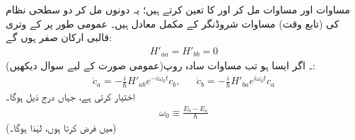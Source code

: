 مساوات  اور مساوات   مل کر  اور   کا  تعین کرتے ہیں؛   یہ دونوں مل کر دو  سطحی  نظام کی  (تابع وقت)  مساوات شروڈنگر کے مکمل معادل ہیں۔ عمومی طور پر  کے وتری قالبی  ارکان  صفر ہوں گے:
\begin{align}
	H'_{aa}=H'_{bb}=0
\end{align}
 (عمومی صورت کے لیے سوال   دیکھیں)۔ اگر ایسا ہو تب مساوات سادہ روپ:
\begin{align}\label{مساوات_تابع_مضطرب_شرح_ضربیات}
	\dot{c}_a=-\frac{i}{\hslash}H'_{ab}e^{-i\omega_0t}c_b,&&\dot{c}_b=-\frac{i}{\hslash}H'_{ba}e^{i\omega_0t}c_a
\end{align}
 اختیار کرتی ہے، جہاں درج ذیل ہوگا۔
\begin{align}
	\omega_0\equiv\frac{E_b-E_a}{\hslash}
\end{align}
(میں  فرض کرتا ہوں،  لہٰذا  ہوگا۔)



